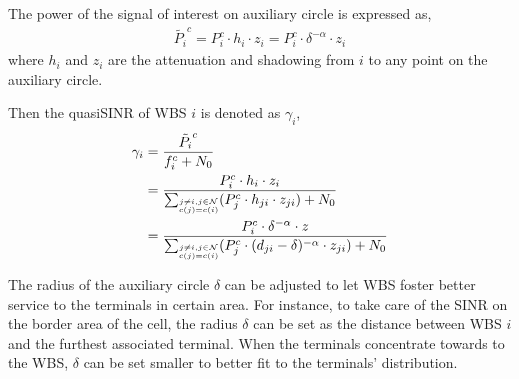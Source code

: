 \documentclass[times]{ettauth}
\theoremstyle{mytheoremstyle}
\theoremstyle{mytheoremstyle}
\theoremstyle{mytheoremstyle}
\begin{document}
The power of the signal of interest on auxiliary circle is expressed as,
\begin{equation}
\label{quasiSINR_1}
\begin{aligned}
\tilde{P_i}^c = P_i^c\cdot h_i\cdot z_i = P_i^c\cdot \delta^{-\alpha}\cdot z_i
\end{aligned}
\end{equation}
where $h_i$ and $z_i$ are the attenuation and shadowing from $i$ to any point on the auxiliary circle.




Then the quasiSINR of WBS $i$ is denoted as $\gamma_{i}$, 
\begin{equation}
\label{quasiSINR}
\begin{aligned}
 \gamma_{i} & = \frac{\tilde{P_i}^c}{f_i^c + N_0} \\
&=\frac{P_{i}^c \cdot h_i \cdot z_i} {\sum_{\tiny\substack{j\neq i, j\in \mathcal{N}\\c(j)=c(i)}} (P_j^c \cdot h_{ji} \cdot z_{ji}) + N_0}\\
&= \frac{P_{i}^c \cdot \delta^{-\alpha}\cdot z} {\sum_{\tiny\substack{j\neq i, j\in \mathcal{N}\\c(j)=c(i)}} (P_j^c \cdot (d_{ji}-\delta)^{-\alpha} \cdot z_{ji}) + N_0}
\end{aligned}
\end{equation}



The radius of the auxiliary circle $\delta$ can be adjusted to let WBS foster better service to the terminals in certain area.
For instance, to take care of the SINR on the border area of the cell, the radius $\delta$ can be set as the distance between WBS $i$ and the furthest associated terminal.
When the terminals concentrate towards to the WBS, $\delta$ can be set smaller to better fit to the terminals' distribution.
\end{document}

